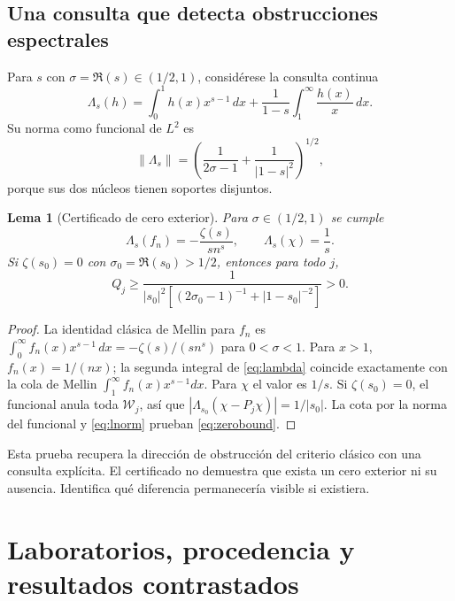 \documentclass[11pt,a4paper]{article}
\theoremstyle{mine}
\newtheorem{lema}[teorema]{Lema}
\theoremstyle{definition}
\newcommand{\WW}{\mathcal W}
\newcommand{\norm}[1]{\left\lVert#1\right\rVert}
\begin{document}
\subsection{Una consulta que detecta obstrucciones espectrales}

Para $s$ con $\sigma=\Re(s)\in(1/2,1)$, considérese la consulta continua
\begin{equation}\label{eq:lambda}
\Lambda_s(h)=\int_0^1h(x)x^{s-1}\,dx
+\frac{1}{1-s}\int_1^\infty\frac{h(x)}{x}\,dx.
\end{equation}
Su norma como funcional de $L^2$ es
\begin{equation}\label{eq:lnorm}
\norm{\Lambda_s}=\left(\frac1{2\sigma-1}+\frac1{|1-s|^2}\right)^{1/2},
\end{equation}
porque sus dos núcleos tienen soportes disjuntos.

\begin{lema}[Certificado de cero exterior]\label{le:zeros}
Para $\sigma\in(1/2,1)$ se cumple
\begin{equation}\label{eq:melldetect}
\Lambda_s(f_n)=-\frac{\zeta(s)}{s n^s},\qquad\Lambda_s(\chi)=\frac1s.
\end{equation}
Si $\zeta(s_0)=0$ con $\sigma_0=\Re(s_0)>1/2$, entonces para todo $j$,
\begin{equation}\label{eq:zerobound}
\boxed{\quad Q_j\ge \frac{1}{|s_0|^2\left[(2\sigma_0-1)^{-1}+|1-s_0|^{-2}\right]}>0.\quad}
\end{equation}
\end{lema}
\begin{proof}
La identidad clásica de Mellin para $f_n$ es
$\int_0^\infty f_n(x)x^{s-1}\,dx=-\zeta(s)/(sn^s)$ para $0<\sigma<1$. Para $x>1$, $f_n(x)=1/(nx)$; la segunda integral de \eqref{eq:lambda} coincide exactamente con la cola de Mellin $\int_1^\infty f_n(x)x^{s-1}dx$. Para $\chi$ el valor es $1/s$. Si $\zeta(s_0)=0$, el funcional anula toda $\WW_j$, así que $|\Lambda_{s_0}(\chi-P_j\chi)|=1/|s_0|$. La cota por la norma del funcional y \eqref{eq:lnorm} prueban \eqref{eq:zerobound}.
\end{proof}

Esta prueba recupera la dirección de obstrucción del criterio clásico con una consulta explícita. El certificado no demuestra que exista un cero exterior ni su ausencia. Identifica qué diferencia permanecería visible si existiera.

\section{Laboratorios, procedencia y resultados contrastados}
\end{document}

